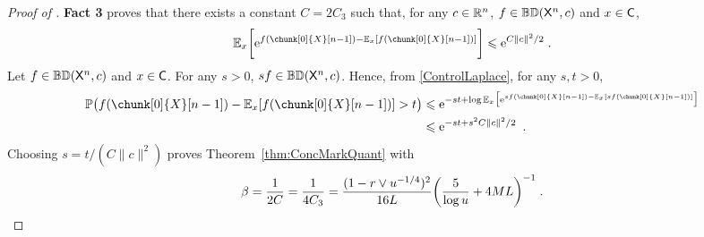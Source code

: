 \documentclass[leqno,11pt,a4paper]{article}
\begin{document}
\begin{proof}[Proof of ]
\noindent
{\bf Fact 3} proves that there exists a constant $C=2C_3$ such that, for any $c\in \mathbb{R}^n$, $f\in \mathbb{BD}(\mathsf{X}^n,c)$ and $x\in \mathsf{C}$,
\begin{equation}\label{ControlLaplace}
 \Ebb_x\bigg[\rme^{f(\chunk[0]{X}[n-1])-\Ebb_x[f(\chunk[0]{X}[n-1])]}\bigg]\leqslant \rme^{C\| c\|^2/2}
\eqsp .
\end{equation}
Let $f\in \mathbb{BD}(\mathsf{X}^n,c)$ and $x\in \mathsf{C}$. 
For any $s>0$, $sf\in \mathbb{BD}(\mathsf{X}^n,c)$.
Hence, from \eqref{ControlLaplace}, for any $s,t>0$,
\begin{align*}
 \Pbb\big(f(\chunk[0]{X}[n-1])-\Ebb_x[f(\chunk[0]{X}[n-1])]>t\big)&\leqslant \rme^{-st+\log\Ebb_x\big[\rme^{sf(\chunk[0]{X}[n-1])-\Ebb_x[sf(\chunk[0]{X}[n-1])]}\big]}\\
 &\leqslant \rme^{-st+s^2C\| c\|^2/2}\enspace.
\end{align*}
Choosing $s=t/(C\|c\|^2)$ proves Theorem~\ref{thm:ConcMarkQuant} with
\[
\beta=\frac1{2C}=\frac1{4C_3}=\frac{(1-r\vee u^{-1/4})^2}{16L}\bigg(\frac5{\log u}+4ML\bigg)^{-1}\;.
\]
\end{proof}
\end{document}
